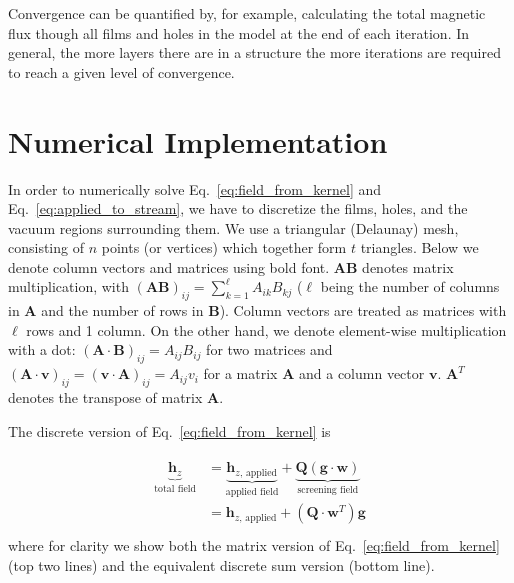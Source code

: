 \documentclass[final,3p,times]{elsarticle}
\begin{document}
Convergence can be quantified by, for example, calculating the total magnetic flux though all films and holes in the model at the end of each iteration. In general, the more layers there are in a structure the more iterations are  required to reach a given level of convergence.

\section{Numerical Implementation}
\label{section:implementation}

In order to numerically solve Eq.~\ref{eq:field_from_kernel} and Eq.~\ref{eq:applied_to_stream}, we have to discretize the films, holes, and the vacuum regions surrounding them. We use a triangular
(Delaunay) mesh, consisting of $n$ points (or vertices)
which together form $t$ triangles. Below we denote column vectors and matrices using bold font. $\mathbf{A}\mathbf{B}$
denotes matrix multiplication, with $(\mathbf{A}\mathbf{B})_{ij}=\sum_{k=1}^\ell A_{ik}B_{kj}$
($\ell$ being the number of columns in $\mathbf{A}$ and the number of rows in $\mathbf{B}$). Column vectors are treated as matrices with $\ell$ rows and 1 column. On the other hand, we denote element-wise multiplication with a dot: $(\mathbf{A}\cdot\mathbf{B})_{ij}=A_{ij}B_{ij}$ for two matrices
and $(\mathbf{A}\cdot\mathbf{v})_{ij}=(\mathbf{v}\cdot\mathbf{A})_{ij}=A_{ij}v_{i}$ for a matrix $\mathbf{A}$ and a column vector $\mathbf{v}$. $\mathbf{A}^T$ denotes the transpose of matrix $\mathbf{A}$.

The discrete version of Eq.~\ref{eq:field_from_kernel} is

\begin{align}
\begin{split}
    \label{eq:field_from_kernel_num}
    \underbrace{\mathbf{h}_z}_\text{total field}
    &= \underbrace{\mathbf{h}_{z,\,\mathrm{applied}}}_\text{applied field}
    + \underbrace{\mathbf{Q}(\mathbf{g}\cdot\mathbf{w})}_\text{screening field}\\
    &=\mathbf{h}_{z,\,\mathrm{applied}}
    + (\mathbf{Q}\cdot\mathbf{w}^T)\mathbf{g}\\
\end{split}
\end{align}
where for clarity we show both the matrix version of Eq.~\ref{eq:field_from_kernel} (top two lines) and the equivalent discrete sum version (bottom line).
\end{document}
